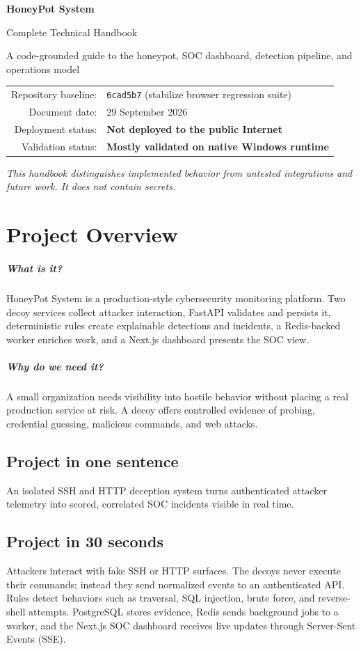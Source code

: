 \documentclass[11pt,oneside]{book}
\newcommand{\what}[1]{\paragraph{What is it?}#1}
\newcommand{\why}[1]{\paragraph{Why do we need it?}#1}
\begin{document}
\begin{titlepage}\centering
{\Huge\bfseries HoneyPot System\par}\vspace{7mm}
{\LARGE Complete Technical Handbook\par}\vspace{12mm}
{\large A code-grounded guide to the honeypot, SOC dashboard, detection pipeline, and operations model\par}\vfill
\begin{tabular}{rl}Repository baseline:& \texttt{6cad5b7} (stabilize browser regression suite)\\
Document date:& 29 September 2026\\
Deployment status:& \textbf{Not deployed to the public Internet}\\
Validation status:& \textbf{Mostly validated on native Windows runtime}
\end{tabular}\vfill
\textit{This handbook distinguishes implemented behavior from untested integrations and future work. It does not contain secrets.}
\end{titlepage}
\frontmatter\tableofcontents\listoffigures\listoftables\mainmatter

\chapter{Project Overview}
\what{HoneyPot System is a production-style cybersecurity monitoring platform. Two decoy services collect attacker interaction, FastAPI validates and persists it, deterministic rules create explainable detections and incidents, a Redis-backed worker enriches work, and a Next.js dashboard presents the SOC view.}
\why{A small organization needs visibility into hostile behavior without placing a real production service at risk. A decoy offers controlled evidence of probing, credential guessing, malicious commands, and web attacks.}
\section*{Project in one sentence}An isolated SSH and HTTP deception system turns authenticated attacker telemetry into scored, correlated SOC incidents visible in real time.
\section*{Project in 30 seconds}Attackers interact with fake SSH or HTTP surfaces. The decoys never execute their commands; instead they send normalized events to an authenticated API. Rules detect behaviors such as traversal, SQL injection, brute force, and reverse-shell attempts. PostgreSQL stores evidence, Redis sends background jobs to a worker, and the Next.js SOC dashboard receives live updates through Server-Sent Events (SSE).
\end{document}
